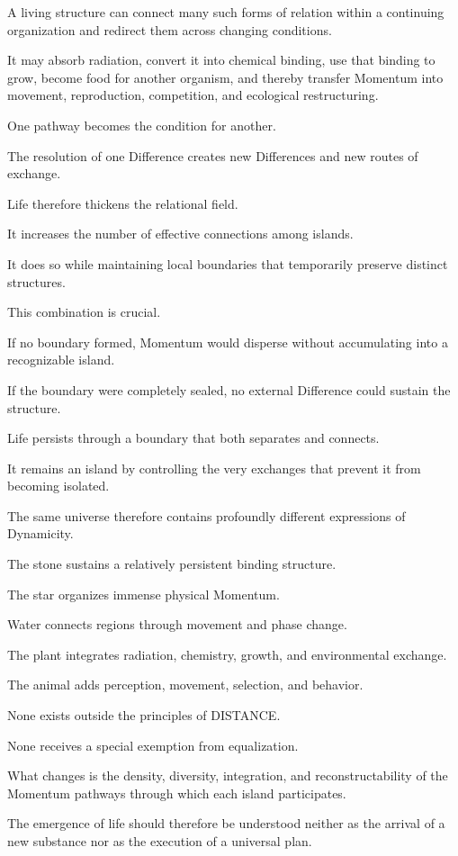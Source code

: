 A living structure can connect many such forms of relation within a continuing organization and redirect them across changing conditions.

It may absorb radiation, convert it into chemical binding, use that binding to grow, become food for another organism, and thereby transfer Momentum into movement, reproduction, competition, and ecological restructuring.

One pathway becomes the condition for another.

The resolution of one Difference creates new Differences and new routes of exchange.

Life therefore thickens the relational field.

It increases the number of effective connections among islands.

It does so while maintaining local boundaries that temporarily preserve distinct structures.

This combination is crucial.

If no boundary formed, Momentum would disperse without accumulating into a recognizable island.

If the boundary were completely sealed, no external Difference could sustain the structure.

Life persists through a boundary that both separates and connects.

It remains an island by controlling the very exchanges that prevent it from becoming isolated.

The same universe therefore contains profoundly different expressions of Dynamicity.

The stone sustains a relatively persistent binding structure.

The star organizes immense physical Momentum.

Water connects regions through movement and phase change.

The plant integrates radiation, chemistry, growth, and environmental exchange.

The animal adds perception, movement, selection, and behavior.

None exists outside the principles of DISTANCE.

None receives a special exemption from equalization.

What changes is the density, diversity, integration, and reconstructability of the Momentum pathways through which each island participates.

The emergence of life should therefore be understood neither as the arrival of a new substance nor as the execution of a universal plan.

